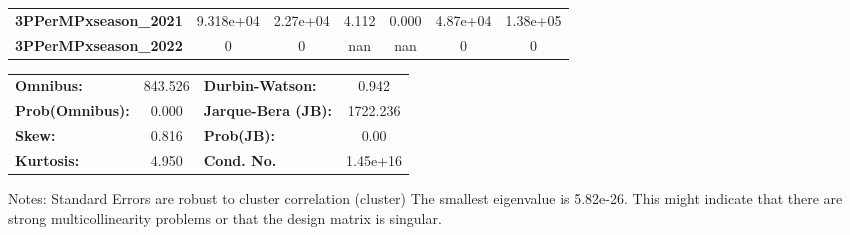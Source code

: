 \begin{center}
\begin{tabular}{lcccccc}
\textbf{3PPerMPxseason\_2021} &    9.318e+04  &     2.27e+04     &     4.112  &         0.000        &     4.87e+04    &     1.38e+05     \\
\textbf{3PPerMPxseason\_2022} &            0  &            0     &       nan  &           nan        &            0    &            0     \\
\bottomrule
\end{tabular}
\begin{tabular}{lclc}
\textbf{Omnibus:}       & 843.526 & \textbf{  Durbin-Watson:     } &    0.942  \\
\textbf{Prob(Omnibus):} &   0.000 & \textbf{  Jarque-Bera (JB):  } & 1722.236  \\
\textbf{Skew:}          &   0.816 & \textbf{  Prob(JB):          } &     0.00  \\
\textbf{Kurtosis:}      &   4.950 & \textbf{  Cond. No.          } & 1.45e+16  \\
\bottomrule
\end{tabular}
\end{center}

Notes: \newline
 [1] Standard Errors are robust to cluster correlation (cluster) \newline
 [2] The smallest eigenvalue is 5.82e-26. This might indicate that there are \newline
 strong multicollinearity problems or that the design matrix is singular.